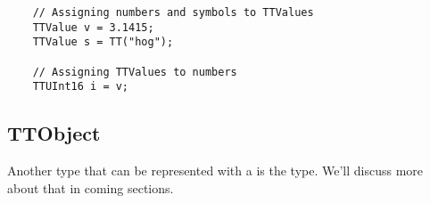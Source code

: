 \begin{lstlisting}
	// Assigning numbers and symbols to TTValues
	TTValue v = 3.1415;
	TTValue s = TT("hog");

	// Assigning TTValues to numbers
	TTUInt16 i = v;
\end{lstlisting}



\subsection{TTObject}

Another type that can be represented with a  is the  type.  We’ll discuss more about that in coming sections.



